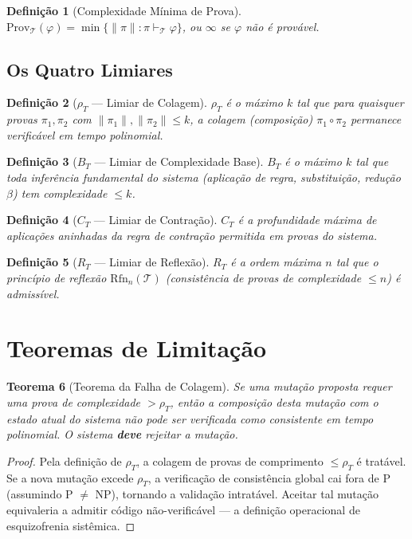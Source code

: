 \documentclass[11pt,a4paper]{article}
\newtheorem{theorem}{Teorema}[section]
\newtheorem{definition}[theorem]{Definição}
\newcommand{\rhoT}{\rho_T}
\newcommand{\BT}{B_T}
\newcommand{\CT}{C_T}
\newcommand{\RT}{R_T}
\begin{document}
\begin{definition}[Complexidade Mínima de Prova]
$\mathrm{Prov}_\mathcal{T}(\varphi) = \min\{\|\pi\| : \pi \vdash_\mathcal{T} \varphi\}$, ou $\infty$ se $\varphi$ não é provável.
\end{definition}

\subsection{Os Quatro Limiares}

\begin{definition}[$\rho_T$ — Limiar de Colagem]
$\rhoT$ é o máximo $k$ tal que para quaisquer provas $\pi_1, \pi_2$ com $\|\pi_1\|, \|\pi_2\| \le k$, a colagem (composição) $\pi_1 \circ \pi_2$ permanece verificável em tempo polinomial.
\end{definition}

\begin{definition}[$\BT$ — Limiar de Complexidade Base]
$\BT$ é o máximo $k$ tal que toda inferência fundamental do sistema (aplicação de regra, substituição, redução $\beta$) tem complexidade $\le k$.
\end{definition}

\begin{definition}[$\CT$ — Limiar de Contração]
$\CT$ é a profundidade máxima de aplicações aninhadas da regra de contração permitida em provas do sistema.
\end{definition}

\begin{definition}[$\RT$ — Limiar de Reflexão]
$\RT$ é a ordem máxima $n$ tal que o princípio de reflexão $\mathrm{Rfn}_n(\mathcal{T})$ (consistência de provas de complexidade $\le n$) é admissível.
\end{definition}

\section{Teoremas de Limitação}

\begin{theorem}[Teorema da Falha de Colagem]
\label{thm:gluing}
Se uma mutação proposta requer uma prova de complexidade $> \rhoT$, então a composição desta mutação com o estado atual do sistema não pode ser verificada como consistente em tempo polinomial. O sistema \textbf{deve} rejeitar a mutação.
\end{theorem}

\begin{proof}
Pela definição de $\rhoT$, a colagem de provas de comprimento $\le \rhoT$ é tratável. Se a nova mutação excede $\rhoT$, a verificação de consistência global cai fora de P (assumindo P $\neq$ NP), tornando a validação intratável. Aceitar tal mutação equivaleria a admitir código não-verificável — a definição operacional de esquizofrenia sistêmica.
\end{proof}
\end{document}
